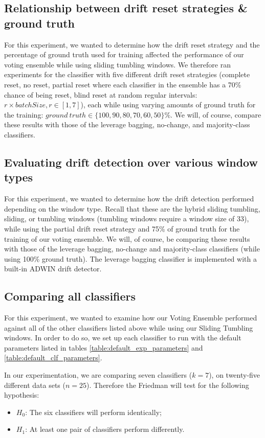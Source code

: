 \subsection{Relationship between drift reset strategies \& ground truth}
For this experiment, we wanted to determine how the drift reset strategy and the percentage of ground truth used for training affected the performance of our voting ensemble while using sliding tumbling windows. We therefore ran experiments for the classifier with five different drift reset strategies (complete reset, no reset, partial reset where each classifier in the ensemble has a 70\% chance of being reset, blind reset at random regular intervals:  $r\times batchSize, r\in[1,7]$), each while using varying amounts of ground truth for the training: $ground\ truth \in \{100, 90, 80, 70, 60, 50\}\%$.
We will, of course,  compare these results with those of the leverage bagging, no-change, and majority-class classifiers.

\subsection{Evaluating drift detection over various window types}
For this experiment, we wanted to determine how the drift detection performed depending on the window type. Recall that these are the hybrid sliding tumbling, sliding, or tumbling windows (tumbling windows require a window size of 33), while using the partial drift reset strategy and 75\% of ground truth for the training of our voting ensemble.
We will, of course, be comparing these results with those of the leverage bagging, no-change and majority-class classifiers (while using 100\% ground truth). The leverage bagging classifier is implemented with a built-in ADWIN drift detector.

\subsection{Comparing all classifiers}
For this experiment, we wanted to examine how our Voting Ensemble performed against all of the other classifiers listed above while using our Sliding Tumbling windows.
In order to do so, we set up each classifier to run with the default parameters listed in tables \ref{table:default_exp_parameters} and \ref{table:default_clf_parameters}.

In our experimentation, we are comparing seven classifiers ($k=7$), on twenty-five different data sets ($n=25$). Therefore the Friedman will test for the following hypothesis:
\begin{itemize}
\item $H_0$: The six classifiers will perform identically;
\item $H_1$: At least one pair of classifiers perform differently.
\end{itemize}


